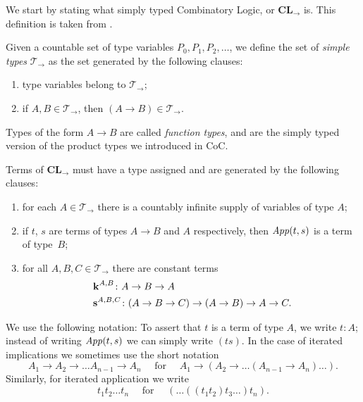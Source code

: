 We start by stating what simply typed Combinatory Logic, or $\textbf{CL}_\to$ is. This definition is taken from \cite{troelstra2000}.
\begin{definition}
    Given a countable set of type variables $P_0, P_1, P_2, \dots$, we define the set of \textit{simple types} $\mathcal{T}_\to$ as
    the set generated by the following clauses:
    \begin{enumerate}
        \item type variables belong to $\mathcal{T}_\to$;
        \item if $A, B \in \mathcal{T}_\to$, then $(A \to B) \in \mathcal{T}_\to$.
    \end{enumerate}
\end{definition}
Types of the form $A \to B$ are called \textit{function types}, and are the simply
typed version of the product types we introduced in CoC.
\begin{definition}
    Terms of $\textbf{CL}_\to$ must have a type assigned and are generated by the following clauses:
    \begin{enumerate}
        \item for each $A \in \mathcal{T}_\to$ there is a countably infinite supply of variables of type $A$;
        \item if $t$, $s$ are terms of types $A \to B$ and $A$ respectively,
            then $\operatorname{\mathit{App}}(t, s)$ is a term of type~$B$;
        \item for all $A, B, C \in \mathcal{T}_\to$ there are constant terms
            \begin{align*}
                &\operatorname{\mathbf{k}}^{A, B} \colon A \to B \to A \\
                &\operatorname{\mathbf{s}}^{A, B, C} \colon (A \to B \to C) \to (A \to B) \to A \to C.
            \end{align*}
    \end{enumerate}
\end{definition}
We use the following notation: To assert that $t$ is a term of type $A$, we write $t \colon A$;
instead of writing $\operatorname{\mathit{App}}(t, s)$ we can simply write $(t s)$. 
In the case of iterated implications we sometimes use the short notation \[
    A_1 \to A_2 \to \dots A_{n-1} \to A_n
    \quad \text{ for } \quad 
    A_1 \to (A_2 \to \dots (A_{n-1} \to A_n) \dots).
\]
Similarly, for iterated application we write \[
    t_1 t_2 \dots t_n 
    \quad \text{ for } \quad
    (\dots((t_1 t_2)t_3 \dots)t_n). 
\]

